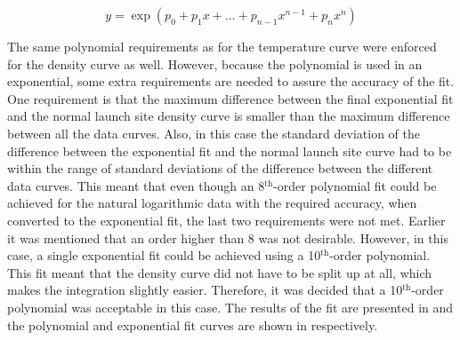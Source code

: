 \begin{equation} \label{eq:expPoly}
y=\exp\left(p_{0}+p_{1}x+\dots+p_{n-1}x^{n-1}+p_{n}x^{n}\right)
\end{equation}



%

\noindent
The same polynomial requirements as for the temperature curve were enforced for the density curve as well. However, because the polynomial is used in an exponential, some extra requirements are needed to assure the accuracy of the fit. One requirement is that the maximum difference between the final exponential fit and the normal launch site density curve is smaller than the maximum difference between all the data curves. Also, in this case the standard deviation of the difference between the exponential fit and the normal launch site curve had to be within the range of standard deviations of the difference between the different data curves. This meant that even though an 8$^{\text{th}}$-order polynomial fit could be achieved for the natural logarithmic data with the required accuracy, when converted to the exponential fit, the last two requirements were not met. Earlier it was mentioned that an order higher than 8 was not desirable. However, in this case, a single exponential fit could be achieved using a 10$^\text{th}$-order polynomial. This fit meant that the density curve did not have to be split up at all, which makes the integration slightly easier. Therefore, it was decided that a 10$^\text{th}$-order polynomial was acceptable in this case. The results of the fit are presented in  and the polynomial and exponential fit curves are shown in  respectively.

%

